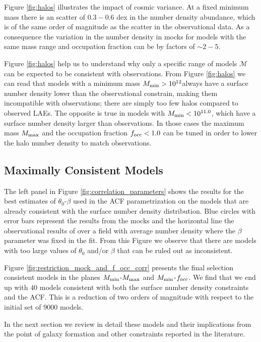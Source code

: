 \documentclass{emulateapj}
\newcommand{\hMsun}{{\ifmmode{h^{-1}{\rm
        {M_{\odot}}}}\else{$h^{-1}{\rm{M_{\odot}}}$}\fi}}
\begin{document}
Figure \ref{fig:halos} illustrates the impact of cosmic variance. At a
fixed minimum mass there is an scatter of $0.3-0.6$ dex in the number
density abundance, which is of the same order of magnitude as the
scatter in the observational data. As a consequence the variation in
the number density in mocks for models with the same mass range and
occupation fraction can be by factors of $\sim 2-5$. 

 
Figure \ref{fig:halos} help us to understand why only a specific range of
models ${\mathcal M}$ can be expected to be consistent with
observations. From Figure \ref{fig:halos} we can read that models with
a minimum mass $M_{\rm min}>10^{12}$\hMsun always have a surface
number density lower than the observational constrain, making them
incompatible with observations; there are simply too few halos
compared to observed LAEs. The opposite is true in models with $M_{\rm
  min}<10^{11.0}$\hMsun, which have a surface number density larger
than observations. In those cases the maximum mass $M_{\rm max}$ and the
occupation fraction $f_{\rm occ}<1.0$  can be tuned in order to lower
the halo number density to match observations.    

\subsection{Maximally Consistent Models}


The left panel in Figure \ref{fig:correlation_parameters} shows the
results for the best estimates of $\theta_{0}$-$\beta$  used in the
ACF parametrization on the models that are already consistent with
the surface number density distribution.  Blue circles with error bars
represent the results from the mocks and the horizontal line the
observational results of \cite{Ouchi2008} over a field with average
number density where the $\beta$ parameter was fixed in the fit. From
this Figure we observe that there are models with too large values of
$\theta_0$ and/or $\beta$ that can be ruled out as inconsistent.

Figure \ref{fig:restriction_mock_and_f_occ_corr} presents the final
selection consistent models in the planes $M_{\rm min}$-$M_{\rm
  max}$ and $M_{\rm   min}$-$f_{\rm occ}$. We find that
we end up with $40$ models consistent with both the surface number
density constraints and the ACF.  This is a reduction of two orders of
magnitude with respect to the initial set of $9000$ models.

In the next section we review in detail these models and their
implications from the point of galaxy formation and other
constraints reported in the literature.
\end{document}
